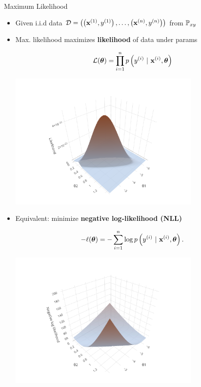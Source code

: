 \documentclass[11pt,compress,t,notes=noshow, xcolor=table]{beamer}
\begin{document}
\begin{vbframe}{Maximum Likelihood}

\begin{itemize}
\item Given i.i.d data $\mathcal{D} = \left( \left(\mathbf{x}^{(1)}, y^{(1)}\right), \ldots, \left(\mathbf{x}^{(n)}, y^{(n)}\right)\right)$ from $\mathbb{P}_{xy}$ 
\item Max. likelihood maximizes \textbf{likelihood} of data under params

\begin{minipage}{0.5\textwidth}
$$ \mathcal{L}(\bm{\theta}) = \prod_{i=1}^n p\left(y^{(i)} ~|~\mathbf{x}^{(i)}, \bm{\theta}\right) $$
\end{minipage}%
\begin{minipage}{0.5\textwidth}
\includegraphics[width = 0.75\textwidth]{figure/log_reg_ml.pdf}
\end{minipage}

\item Equivalent: minimize \textbf{negative log-likelihood (NLL)}

\begin{minipage}{0.5\textwidth}
$$ -\ell(\bm{\theta}) = -\sum\limits_{i=1}^n \log p\left(y^{(i)} ~|~\mathbf{x}^{(i)}, \bm{\theta}\right). $$
\end{minipage}%
\begin{minipage}{0.5\textwidth}
\includegraphics[width = 0.75\textwidth]{figure/log_reg_erm.pdf}
\end{minipage}
\end{itemize}

\end{vbframe}
\end{document}

